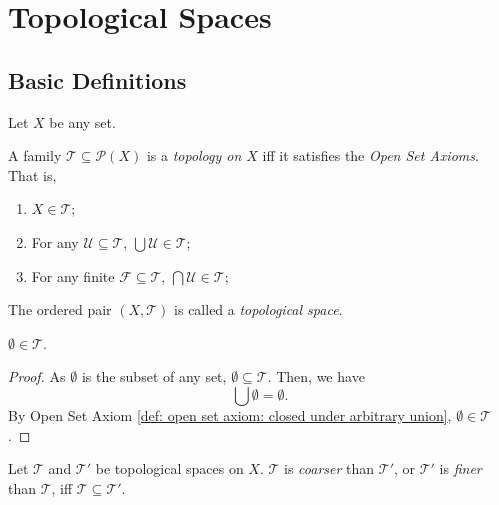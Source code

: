
\chapter{Topological Spaces}


\section{Basic Definitions}


\begin{definition}
	\label{def: topological space}
	
	Let $X$ be any set.
	
	A family $\mathcal T \subseteq \mathcal P(X)$ is a \textit{topology on $X$} iff it satisfies the \textit{Open Set Axioms}. That is,
	\begin{enumerate}
		\item
		\label{def: open set axiom: necessary elements}
		$X \in \mathcal T$;
		
		\item
		\label{def: open set axiom: closed under arbitrary union}
		For any $\mathcal U \subseteq \mathcal T$, $\bigcup \mathcal U \in \mathcal T$;
		
		\item
		\label{def: open set axiom: closed under finite intersection}
		For any finite $\mathcal F \subseteq \mathcal T$, $\bigcap \mathcal U \in \mathcal T$;
	\end{enumerate}
	
	The ordered pair $(X, \mathcal T)$ is called a \textit{topological space}.
\end{definition}


\begin{theorem}
	$\emptyset \in \mathcal T$.
	
	\begin{proof}
		As $\emptyset$ is the subset of any set, $\emptyset \subseteq \mathcal T$. Then, we have
		$$
		\bigcup \emptyset = \emptyset.
		$$
		By Open Set Axiom \ref{def: open set axiom: closed under arbitrary union}, $\emptyset \in \mathcal T$.
	\end{proof}
\end{theorem}


\begin{definition}
	Let $\mathcal T$ and $\mathcal T'$ be topological spaces on $X$. $\mathcal T$ is \textit{coarser} than $\mathcal T'$, or $\mathcal T'$ is \textit{finer} than $\mathcal T$, iff $\mathcal T \subseteq \mathcal T'$.
\end{definition}


